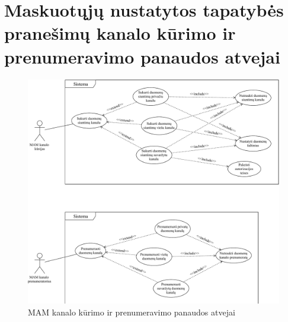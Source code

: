 \section{Maskuotųjų nustatytos tapatybės pranešimų kanalo kūrimo ir prenumeravimo panaudos atvejai} \label{appendix:2}
\begin{figure}[H]
    \centering
    \includegraphics[scale=0.63]{images/ucd-1-2}
    \caption{MAM kanalo kūrimo ir prenumeravimo panaudos atvejai}
\end{figure}


